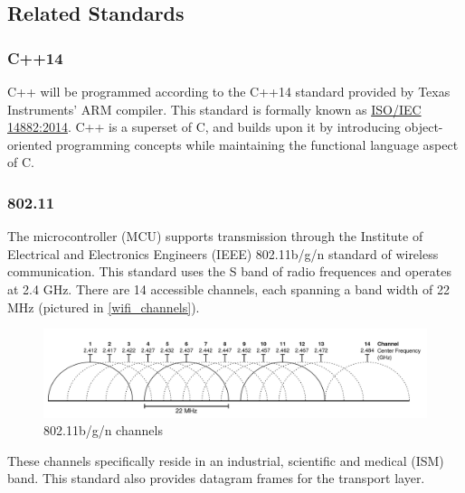 \subsection{Related Standards}
\subsubsection{C++14} C++ will be programmed according to the C++14 standard provided by Texas Instruments' ARM compiler. This standard is formally known as
\href{https://www.iso.org/standard/64029.html}{ISO/IEC 14882:2014}. C++ is
a superset of C, and builds upon it by introducing object-oriented
programming concepts while maintaining the functional language aspect of C.

\subsubsection{802.11} The microcontroller (MCU) supports transmission through the Institute of
Electrical and Electronics Engineers (IEEE) 802.11b/g/n standard of wireless
communication. This standard uses the S band of radio frequences and
operates at 2.4 GHz. There are 14 accessible channels, each spanning a band
width of 22 MHz (pictured in \autoref{wifi_channels}).
\begin{figure}[H]
    \caption{802.11b/g/n channels}
    \label{wifi_channels}
    \centering
    \includegraphics[width=\textwidth]{images/wifi_channels.png}
\end{figure}
These channels specifically reside in an industrial, scientific and medical
(ISM) band. This standard also provides datagram frames for the transport
layer.

